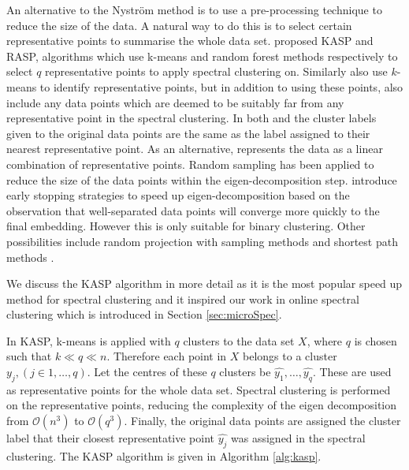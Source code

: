 
An alternative to the Nystr\"{o}m method is to use a pre-processing technique to reduce the size of the data. A natural way to do this is to select certain representative points to summarise the whole data set.  \cite{Yan2009} proposed KASP and RASP, algorithms which use k-means and random forest methods respectively to select $q$ representative points to apply spectral clustering on.  Similarly \cite{Shinnou2008} also use $k$-means to identify representative points, but in addition to using these points, \cite{Shinnou2008} also include any data points which are deemed to be suitably far from any representative point in the spectral clustering.  In both \cite{Yan2009} and \cite{Shinnou2008} the cluster labels given to the original data points are the same as the label assigned to their nearest representative point. As an alternative, \cite{Chen2011} represents the data as a linear combination of representative points. Random sampling has been applied to reduce the size of the data points within the eigen-decomposition step. \cite{Chen2006a, Liu2007} introduce early stopping strategies to speed up eigen-decomposition based on the observation that well-separated data points will converge more quickly to the final embedding. However this is only suitable for binary clustering.  Other possibilities include random projection with sampling methods \citep{Sakai2009} and shortest path methods \citep{Liu2013b}.


We discuss the KASP algorithm in more detail as it is the most popular speed up method for spectral clustering and it inspired our work in online spectral clustering which is introduced in Section \ref{sec:microSpec}.

In KASP, k-means is applied with $q$ clusters to the data set $X$, where $q$ is chosen such that $k \ll q \ll n$. Therefore each point in $X$ belongs to a cluster $y_j, (j \in 1, \hdots, q)$. Let the centres of these $q$ clusters be  $\widehat{y_1}, \hdots, \widehat{y_q}$. These  are used as representative points for the whole data set. Spectral clustering is performed on the representative points, reducing the complexity of the eigen decomposition from $\mathcal{O}(n^3)$ to $\mathcal{O}(q^3)$. Finally, the original data points are assigned the cluster label  that their closest representative point $\widehat{y_j}$ was assigned in the spectral clustering. The KASP algorithm is given in Algorithm \ref{alg:kasp}.


